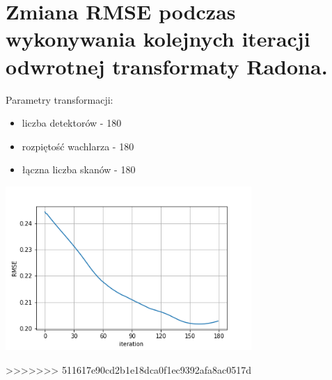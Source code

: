 \documentclass[a4paper, 11pt]{article}
\begin{document}
	\section{Zmiana RMSE podczas wykonywania kolejnych iteracji odwrotnej transformaty Radona.}
	
	
	Parametry transformacji:
	\begin{itemize}
		\item liczba detektorów - 180
		\item rozpiętość wachlarza - 180\degree
		\item łączna liczba skanów - 180
	\end{itemize}
	\begin{center}
		\includegraphics[width=0.7\textwidth]{change.png}
	\end{center}
>>>>>>> 511617e90cd2b1e18dca0f1ec9392afa8ac0517d
\end{document}

